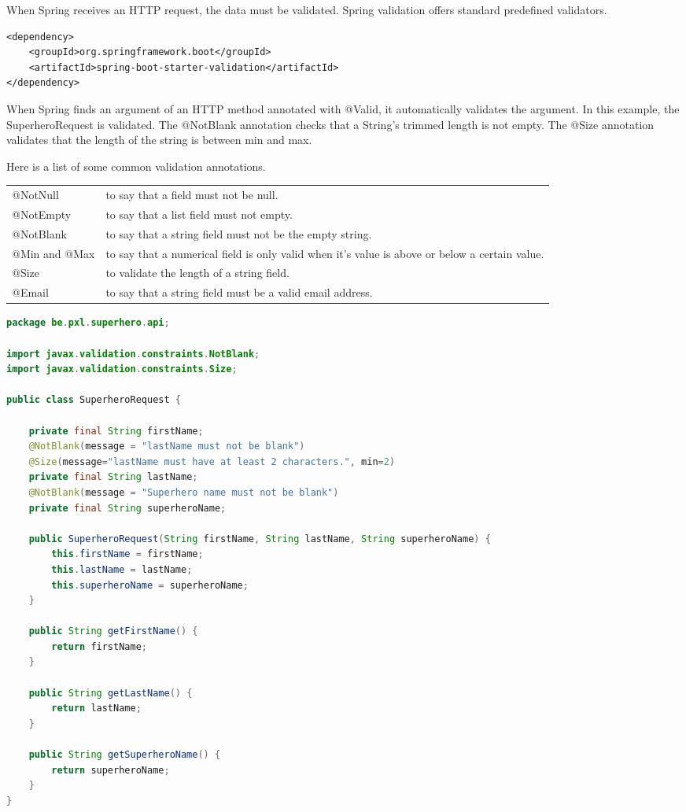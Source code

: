 When Spring receives an HTTP request, the data must be validated. 
Spring validation offers  standard predefined validators.  

\begin{lstlisting}
<dependency>
	<groupId>org.springframework.boot</groupId>
	<artifactId>spring-boot-starter-validation</artifactId>
</dependency>
\end{lstlisting}

When Spring finds an argument of an HTTP method annotated with @Valid, it automatically validates the argument.  In this example, the SuperheroRequest is validated. 
The @NotBlank annotation checks that a String's trimmed length is not empty.
The @Size annotation validates that the length of the string is between min and max.

Here is a list of some common validation annotations.

\begin{tabularx}{\textwidth}{|l|X|}
\hline
@NotNull & to say that a field must not be null. \\
@NotEmpty & to say that a list field must not empty. \\
@NotBlank & to say that a string field must not be the empty string. \\
@Min and @Max & to say that a numerical field is only valid when it’s value is above or below a certain value.\\
@Size & to validate the length of a string field. \\
@Email & to say that a string field must be a valid email address.\\
\hline
\end{tabularx}

\begin{lstlisting}[language=java, frame=single]
package be.pxl.superhero.api;

import javax.validation.constraints.NotBlank;
import javax.validation.constraints.Size;

public class SuperheroRequest {

	private final String firstName;
	@NotBlank(message = "lastName must not be blank")
	@Size(message="lastName must have at least 2 characters.", min=2)
	private final String lastName;
	@NotBlank(message = "Superhero name must not be blank")
	private final String superheroName;

	public SuperheroRequest(String firstName, String lastName, String superheroName) {
		this.firstName = firstName;
		this.lastName = lastName;
		this.superheroName = superheroName;
	}

	public String getFirstName() {
		return firstName;
	}

	public String getLastName() {
		return lastName;
	}

	public String getSuperheroName() {
		return superheroName;
	}
}
\end{lstlisting}

